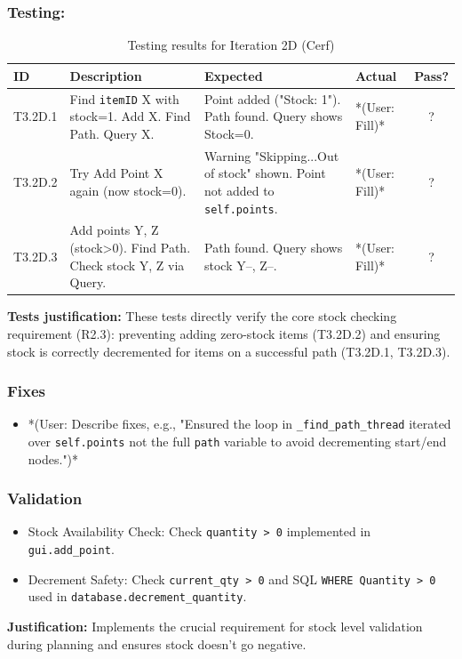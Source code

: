 \subsubsection{Testing:}
\begin{table}[htbp]
	\centering
	\begin{tabularx}{\textwidth}{|l|X|p{4.5cm}|p{1.5cm}|c|}
		\hline
		\textbf{ID} & \textbf{Description} & \textbf{Expected} & \textbf{Actual} & \textbf{Pass?} \\
		\hline
		T3.2D.1 & Find \verb|itemID| X with stock=1. Add X. Find Path. Query X. & Point added ("Stock: 1"). Path found. Query shows Stock=0. & *(User: Fill)* & ? \\
		\hline
		T3.2D.2 & Try Add Point X again (now stock=0). & Warning "Skipping...Out of stock" shown. Point not added to \verb|self.points|. & *(User: Fill)* & ? \\
		\hline
		T3.2D.3 & Add points Y, Z (stock>0). Find Path. Check stock Y, Z via Query. & Path found. Query shows stock Y--, Z--. & *(User: Fill)* & ? \\
		\hline
	\end{tabularx}
	\caption{Testing results for Iteration 2D (Cerf)}
\end{table}
\textbf{Tests justification:} These tests directly verify the core stock checking requirement (R2.3): preventing adding zero-stock items (T3.2D.2) and ensuring stock is correctly decremented for items on a successful path (T3.2D.1, T3.2D.3).

\subsubsection{Fixes}
\begin{itemize}
	\item *(User: Describe fixes, e.g., "Ensured the loop in \verb|_find_path_thread| iterated over \verb|self.points| not the full \verb|path| variable to avoid decrementing start/end nodes.")*
\end{itemize}

\subsubsection{Validation}
\begin{itemize}
	\item Stock Availability Check: Check \verb|quantity > 0| implemented in \verb|gui.add_point|.
	\item Decrement Safety: Check \verb|current_qty > 0| and SQL \verb|WHERE Quantity > 0| used in \verb|database.decrement_quantity|.
\end{itemize}
\textbf{Justification:} Implements the crucial requirement for stock level validation during planning and ensures stock doesn't go negative.


